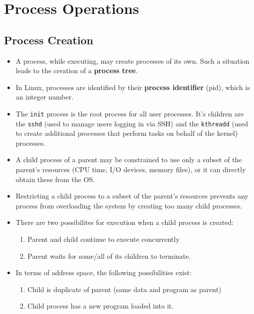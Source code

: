 \documentclass{article}
\theoremstyle{plain}
\theoremstyle{definition}
\begin{document}
\section{Process Operations}
\subsection{Process Creation}
\begin{itemize}
    \item A process, while executing, may create processes of its own. Such a situation leads to the creation of a \textbf{process tree}.
    
    \item In Linux, processes are identified by their \textbf{process identifier} (pid), which is an integer number. 
    
    \item The \texttt{init} process is the root process for all user processes. It's children are the \texttt{sshd} (used to manage users logging in via SSH) and the \texttt{kthreadd} (used to create additional processes that perform tasks on behalf of the kernel) processes. 
    \item A child process of a parent may be constrained to use only a subset of the parent's resources (CPU time, I/O devices, memory files), or it can directly obtain these from the OS.
    
    \item Restricting a child process to a subset of the parent’s resources prevents any process from overloading the system by creating too many child processes.
    
    \item There are two possibilites for execution when a child process is created:
    \begin{enumerate}
        \item Parent and child continue to execute concurrently
        
        \item Parent waits for some/all of its children to terminate.
    \end{enumerate}
    
    \item In terms of address space, the following possibilities exist:
    \begin{enumerate}
        \item Child is duplicate of parent (same data and program as parent)
        
        \item Child process has a new program loaded into it.
    \end{enumerate}
\end{itemize}
\end{document}
